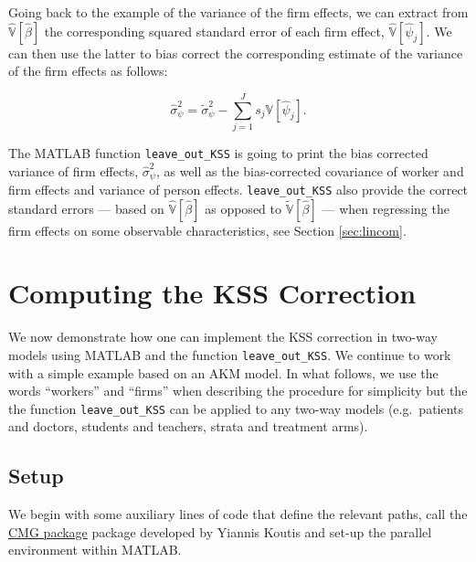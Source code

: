 \documentclass[11pt]{article}
\begin{document}
Going back to the example of the variance of the firm effects, we can
extract from \(\hat{\mathbb{V}}[\hat{\beta}]\) the corresponding squared
standard error of each firm effect, \(\hat{\mathbb{V}}[\hat{\psi}_{j}]\).
We can then use the latter to bias correct the corresponding estimate of
the variance of the firm effects as follows:

\begin{equation}
\hat{\sigma}^{2}_{\psi}=\tilde{\sigma}^{2}_{\psi}-\sum_{j=1}^{J}s_{j}{\mathbb{V}[\hat{\psi}_{j}]}.
\end{equation}

The MATLAB function \texttt{leave\_out\_KSS} is going to print the bias
corrected variance of firm effects, \(\hat{\sigma}^{2}_{\psi}\), as well
as the bias-corrected covariance of worker and firm effects and variance
of person effects.  \texttt{leave\_out\_KSS} also provide the correct standard errors --- based on \(\hat{\mathbb{V}}[\hat{\beta}]\)  as opposed to \(\tilde{\mathbb{V}}[\hat{\beta}]\) --- when regressing the firm effects on some observable characteristics, see Section \ref{sec:lincom}.
\hypertarget{computing-the-kss-correction}{%
\section{Computing the KSS
Correction}\label{computing-the-kss-correction}}

We now demonstrate how one can implement the KSS correction in two-way
models using MATLAB and the function \texttt{leave\_out\_KSS}. We
continue to work with a simple example based on an AKM model. In what
follows, we use the words ``workers'' and ``firms'' when describing the
procedure for simplicity but the the function \texttt{leave\_out\_KSS}
can be applied to any two-way models (e.g.~patients and doctors,
students and teachers, strata and treatment arms).

\hypertarget{setup}{%
\subsection{Setup}\label{setup}}

We begin with some auxiliary lines of code that define the relevant
paths, call the  \href{http://www.cs.cmu.edu/jkoutis/cmg.html}{CMG package} package developed by Yiannis Koutis and set-up the
parallel environment within MATLAB.
\end{document}
